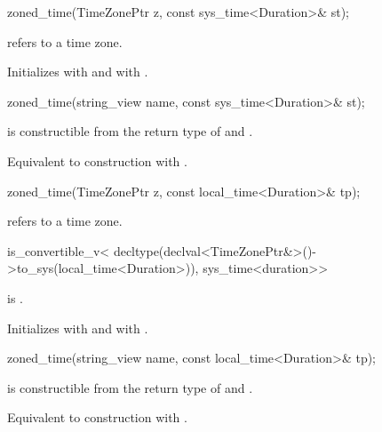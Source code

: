 \begin{itemdecl}
zoned_time(TimeZonePtr z, const sys_time<Duration>& st);
\end{itemdecl}

\begin{itemdescr}
\pnum
\expects
{} refers to a time zone.

\pnum
\effects
Initializes  with  and  with .
\end{itemdescr}

\begin{itemdecl}
zoned_time(string_view name, const sys_time<Duration>& st);
\end{itemdecl}

\begin{itemdescr}
\pnum
\constraints
{} is constructible from the return type of  and .

\pnum
\effects
Equivalent to construction with .
\end{itemdescr}

\begin{itemdecl}
zoned_time(TimeZonePtr z, const local_time<Duration>& tp);
\end{itemdecl}

\begin{itemdescr}
\pnum
\expects
{} refers to a time zone.

\pnum
\constraints
\begin{codeblock}
is_convertible_v<
  decltype(declval<TimeZonePtr&>()->to_sys(local_time<Duration>{})),
  sys_time<duration>>
\end{codeblock}
is .

\pnum
\effects
Initializes  with  and  with .
\end{itemdescr}

\begin{itemdecl}
zoned_time(string_view name, const local_time<Duration>& tp);
\end{itemdecl}

\begin{itemdescr}
\pnum
\constraints
{} is constructible from the return type of  and .

\pnum
\effects
Equivalent to construction with .
\end{itemdescr}

